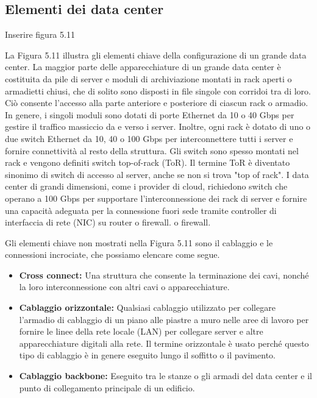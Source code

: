 \subsection{Elementi dei data center}

Inserire figura 5.11

La Figura 5.11 illustra gli elementi chiave della configurazione di un grande data center. La maggior parte delle apparecchiature di un grande data center è costituita da pile di server e moduli di archiviazione montati in rack aperti o armadietti chiusi, che di solito sono disposti in file singole con corridoi tra di loro. Ciò consente l'accesso alla parte anteriore e posteriore di ciascun rack o armadio. In genere, i singoli moduli sono dotati di porte Ethernet da 10 o 40 Gbps per gestire il traffico massiccio da e verso i server. Inoltre, ogni rack è dotato di uno o due switch Ethernet da 10, 40 o 100 Gbps per interconnettere tutti i server e fornire connettività al resto della struttura. Gli switch sono spesso montati nel rack e vengono definiti switch top-of-rack (ToR). Il termine ToR è diventato sinonimo di switch di accesso al server, anche se non si trova "top of rack". I data center di grandi dimensioni, come i provider di cloud, richiedono switch che operano a 100 Gbps per supportare l'interconnessione dei rack di server e fornire una capacità adeguata per la connessione fuori sede tramite controller di interfaccia di rete (NIC) su router o firewall. o firewall. 

\singlespacing

Gli elementi chiave non mostrati nella Figura 5.11 sono il cablaggio e le connessioni incrociate, che possiamo elencare come segue.

\begin{itemize}
    \item \textbf{Cross connect:} Una struttura che consente la terminazione dei cavi, nonché la loro interconnessione con altri cavi o apparecchiature.
    
    \item \textbf{Cablaggio orizzontale:} Qualsiasi cablaggio utilizzato per collegare l'armadio di cablaggio di un piano alle piastre a muro nelle aree di lavoro per fornire le linee della rete locale (LAN) per collegare server e altre apparecchiature digitali alla rete. Il termine orizzontale è usato perché questo tipo di cablaggio è in genere eseguito lungo il soffitto o il pavimento.
    
    \item \textbf{Cablaggio backbone:} Eseguito tra le stanze o gli armadi del data center e il punto di collegamento principale di un edificio.

\end{itemize}

